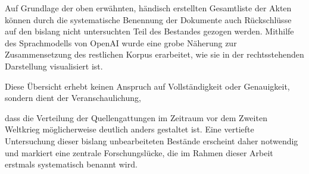 \documentclass[12pt, a4paper, ngerman, bidi=default]{article}
\begin{document}
\noindent
\begin{minipage}[t]{0.48\textwidth}
  \justifying
  Auf Grundlage der oben erwähnten, händisch erstellten Gesamtliste der Akten können durch 
  die systematische Benennung der Dokumente auch Rückschlüsse auf den bislang nicht untersuchten 
  Teil des Bestandes gezogen werden. Mithilfe des Sprachmodells von OpenAI wurde eine grobe Näherung zur 
  Zusammensetzung des restlichen Korpus erarbeitet, wie sie in der rechtsstehenden Darstellung visualisiert ist.
  
  Diese Übersicht erhebt keinen Anspruch auf Vollständigkeit oder Genauigkeit, sondern dient der Veranschaulichung, 

\end{minipage}%
\hfill
\begin{minipage}[t]{0.48\textwidth}
  \centering
  \vspace*{0.2cm} %
  
  \label{fig:dokumententypen-schätzung}
\end{minipage}

\vspace{1em}

\noindent
dass die Verteilung der Quellengattungen im Zeitraum vor dem Zweiten Weltkrieg möglicherweise deutlich anders gestaltet ist. Eine vertiefte Untersuchung dieser bislang unbearbeiteten Bestände erscheint daher notwendig und markiert eine zentrale Forschungslücke, die im Rahmen dieser Arbeit erstmals systematisch benannt wird.
\end{document}
